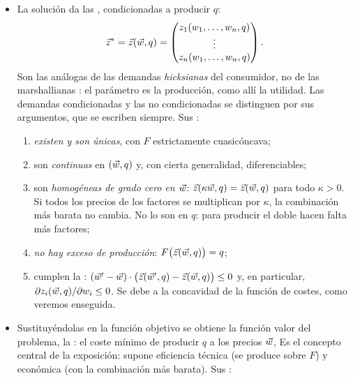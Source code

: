 \documentclass[11pt]{article}
\begin{document}
\begin{itemize}
\item La solución da las , condicionadas a producir $q$:
  \begin{equation}
  \vec{z}^*=\vec{z}(\vec{w},q)=\begin{pmatrix} z_1(w_1,\dots,w_n,q)\\ \vdots\\ z_n(w_1,\dots,w_n,q)\end{pmatrix}. \label{eq:condicionadas}
  \end{equation}
  Son las análogas de las demandas \emph{hicksianas} del consumidor, no de las marshallianas : el parámetro es la producción, como allí la utilidad. Las demandas condicionadas y las no condicionadas se distinguen por sus argumentos, que se escriben siempre. Sus \nocite{MasColellWhinstonGreen1995,Perez2004Microeconomia}:
  \begin{enumerate}
  \item \emph{existen y son únicas}, con $F$ estrictamente cuasicóncava;
  \item son \emph{continuas} en $(\vec{w},q)$ y, con cierta generalidad, diferenciables;
  \item son \emph{homogéneas de grado cero en $\vec{w}$}: $\vec{z}(\kappa\vec{w},q)=\vec{z}(\vec{w},q)$ para todo $\kappa>0$. Si todos los precios de los factores se multiplican por $\kappa$, la combinación más barata no cambia. No lo son en $q$: para producir el doble hacen falta más factores;
  \item \emph{no hay exceso de producción}: $F\big(\vec{z}(\vec{w},q)\big)=q$;
  \item cumplen la : $(\vec{w}'-\vec{w})\cdot\big(\vec{z}(\vec{w}',q)-\vec{z}(\vec{w},q)\big)\leq 0$ y, en particular, $\partial z_i(\vec{w},q)/\partial w_i\leq 0$. Se debe a la concavidad de la función de costes, como veremos enseguida.
  \end{enumerate}
\item Sustituyéndolas en la función objetivo se obtiene la función valor del problema, la : el coste mínimo de producir $q$ a los precios $\vec{w}$,
  Es el concepto central de la exposición: supone eficiencia técnica (se produce sobre $F$) y económica (con la combinación más barata). Sus \nocite{MasColellWhinstonGreen1995}:

\end{itemize}
\end{document}
